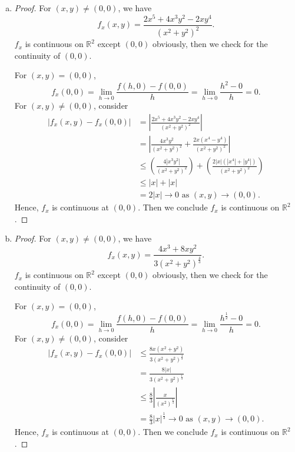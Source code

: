 \begin{Exercise}
\begin{enumerate}[a)]
\item
\begin{proof}
For $(x,y) \neq (0,0)$, we have
$$
f_x(x,y) = \frac{2x^5+4x^3y^2-2x y^4}{(x^2+y^2)^2}.
$$
$f_x$ is continuous on $\mathbb{R}^2$ except $(0,0)$ obviously, then we check for the continuity of $(0,0)$.

For $(x,y) = (0,0)$,
$$
f_x(0,0) = \lim_{h\to 0} \frac{f(h,0)-f(0,0)}{h}
= \lim_{h\to 0} \frac{h^2-0}{h}
= 0.
$$
For $(x,y) \neq (0,0)$, consider
\begin{align*}
\left| f_x(x,y) - f_x(0,0) \right|
&= \left| \frac{2x^5+4x^3y^2-2x y^4}{(x^2+y^2)^2} \right| \\
&= \left| \frac{4x^3y^2}{(x^2+y^2)^2} + \frac{2x(x^4-y^4)}{(x^2+y^2)^2} \right| \\
&\leq \left(\frac{4|x^3y^2|}{(x^2+y^2)^2} \right) + \left( \frac{2|x|(|x^4|+|y^4|)}{(x^2+y^2)^2} \right) \\
&\leq |x| + |x| \\
&= 2|x| \to 0 \text{ as } (x,y)\to(0,0).
\end{align*}
Hence, $f_x$ is continuous at $(0,0)$. Then we conclude $f_x$ is continuous on  $\mathbb{R}^2$.
\end{proof}

\item
\begin{proof}
For $(x,y) \neq (0,0)$, we have
$$
f_x(x,y) = \frac{4x^3+8x y^2}{3(x^2+y^2)^{\frac{4}{3}}}.
$$
$f_x$ is continuous on $\mathbb{R}^2$ except $(0,0)$ obviously, then we check for the continuity of $(0,0)$.

For $(x,y) = (0,0)$,
$$
f_x(0,0) = \lim_{h\to 0} \frac{f(h,0)-f(0,0)}{h}
= \lim_{h\to 0} \frac{h^{\frac{1}{2}}-0}{h}
= 0.
$$
For $(x,y) \neq (0,0)$, consider
\begin{align*}
\left| f_x(x,y) - f_x(0,0) \right|
&\leq \frac{8x(x^2+y^2)}{3(x^2+y^2)^{\frac{4}{3}}} \\
&= \frac{8|x|}{3(x^2+y^2)^{\frac{1}{3}}} \\
&\leq \frac{8}{3} \left| \frac{x}{(x^2)^{\frac{1}{3}}} \right| \\
&= \frac{8}{3} |x|^{\frac{1}{3}} \to 0 \text{ as } (x,y)\to(0,0).
\end{align*}
Hence, $f_x$ is continuous at $(0,0)$. Then we conclude $f_x$ is continuous on  $\mathbb{R}^2$.
\end{proof}
\end{enumerate}
\end{Exercise}